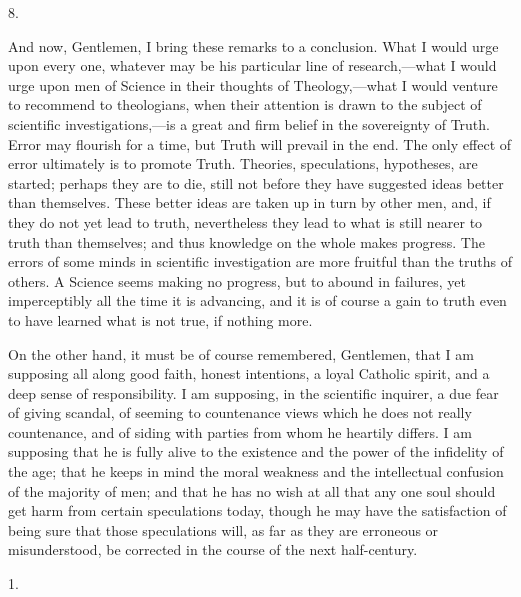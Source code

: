 8.

And now, Gentlemen, I bring these remarks to a conclusion. What I
would urge upon every one, whatever may be his particular line of
research,—what I would urge upon men of Science in their thoughts of
Theology,—what I would venture to recommend to theologians, when
their attention is drawn to the subject of scientific investigations,—is
a great and firm belief in the sovereignty of Truth. Error may
flourish for a time, but Truth will prevail in the end. The only
effect of error ultimately is to promote Truth. Theories,
speculations, hypotheses, are started; perhaps they are to die, still
not before they have suggested ideas better than themselves. These
better ideas are taken up in turn by other men, and, if they do not
yet lead to truth, nevertheless they lead to what is still nearer to
truth than themselves; and thus knowledge on the whole makes progress.
The errors of some minds in scientific investigation are more
fruitful than the truths of others. A Science seems making no
progress, but to abound in failures, yet imperceptibly all the time it
is advancing, and it is of course a gain to truth even to have learned
what is not true, if nothing more.

On the other hand, it must be of course remembered, Gentlemen, that
I am supposing all along good faith, honest intentions, a loyal
Catholic spirit, and a deep sense of responsibility. I am supposing,
in the scientific inquirer, a due fear of giving scandal, of seeming
to countenance views which he does not really countenance, and of
siding with parties from whom he heartily differs. I am supposing that
he is fully alive to the existence and the power of the infidelity of
the age; that he keeps in mind the moral weakness and the intellectual
confusion of the majority of men; and that he has no wish at all that
any one soul should get harm from certain speculations today, though
he may have the satisfaction of being sure that those speculations
will, as far as they are erroneous or misunderstood, be corrected in
the course of the next half-century.



1.

